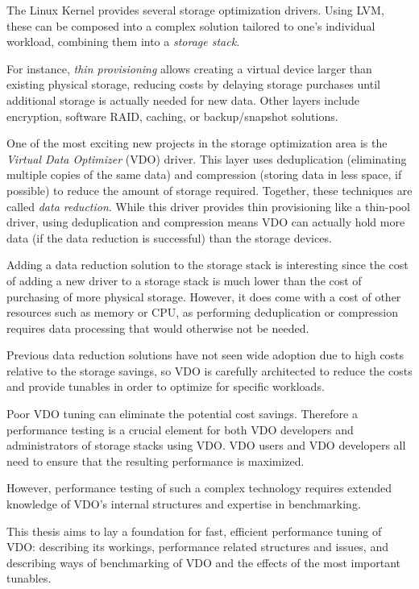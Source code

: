 \documentclass[
  color, %
  table, %
  lof,   %
  lot,   %
]{fithesis3}
\begin{document}
The Linux Kernel provides several storage optimization drivers. Using LVM, these can be composed into a complex solution tailored to one's individual workload, combining them into a \emph{storage stack}.

For instance, \emph{thin provisioning} allows creating a virtual device larger than existing physical storage, reducing costs by delaying storage purchases until additional storage is actually needed for new data. Other layers include encryption, software RAID, caching, or backup/snapshot solutions.

One of the most exciting new projects in the storage optimization area is the \emph{Virtual Data Optimizer} (VDO) driver. This layer uses deduplication (eliminating multiple copies of the same data) and compression (storing data in less space, if possible) to reduce the amount of storage required. Together, these techniques are called \emph{data reduction}. While this driver provides thin provisioning like a thin-pool driver, using deduplication and compression means VDO can actually hold more data (if the data reduction is successful) than the storage devices.

Adding a data reduction solution to the storage stack is interesting since the cost of adding a new driver to a storage stack is much lower than the cost of purchasing of more physical storage. However, it does come with a cost of other resources such as memory or CPU, as performing deduplication or compression requires data processing that would otherwise not be needed.

Previous data reduction solutions have not seen wide adoption due to high costs relative to the storage savings, so VDO is carefully architected to reduce the costs and provide tunables in order to optimize for specific workloads.

Poor VDO tuning can eliminate the potential cost savings. Therefore a performance testing is a crucial element for both VDO developers and administrators of storage stacks using VDO. VDO users and VDO developers all need to ensure that the resulting performance is maximized.

However, performance testing of such a complex technology requires extended knowledge of VDO's internal structures and expertise in benchmarking.

This thesis aims to lay a foundation for fast, efficient performance tuning of VDO: describing its workings, performance related structures and issues, and describing ways of benchmarking of VDO and the effects of the most important tunables.
\end{document}
